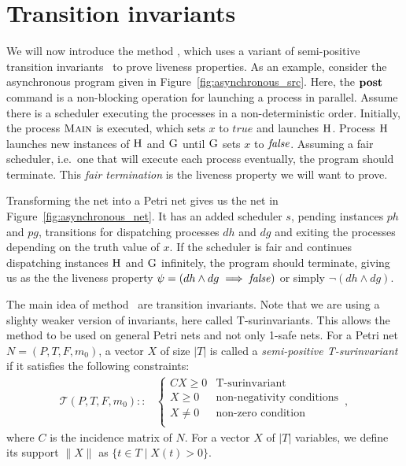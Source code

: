 \section{Transition invariants}
\label{sec:transition_invariants}

We will now introduce the method \liveness, which uses
a variant of semi-positive transition invariants~\cite{EsparzaBruns96}
to prove liveness properties. As an example, consider the
asynchronous program given in Figure~\ref{fig:asynchronous_src}.
Here, the $\textbf{post}$ command is a non-blocking operation for
launching a process in parallel. Assume there is a scheduler
executing the processes in a non-deterministic order.
Initially, the process $\textsc{Main}$ is executed, which
sets $x$ to $true$ and launches $\textsc{H}$.
Process $\textsc{H}$ launches new instances of $\textsc{H}$
and $\textsc{G}$ until $\textsc{G}$ sets $x$ to $\operatorname{\mathit{false}}$.
Assuming a fair scheduler, i.e.\ one that will execute each process
eventually, the program should terminate. This
\emph{fair termination} is the liveness
property we will want to prove.



Transforming the net into a Petri net gives us the net in
Figure~\ref{fig:asynchronous_net}. It has an added scheduler
$s$, pending instances $ph$ and $pg$, transitions for
dispatching processes $dh$ and $dg$ and exiting the processes
depending on the truth value of $x$.
If the scheduler is fair and continues dispatching instances
$\textsc{H}$ and $\textsc{G}$ 
infinitely, the program should terminate, giving us as the
the liveness property $\psi = (dh \land dg \implies \operatorname{\mathit{false}})$
or simply $\neg (dh \land dg)$.



The main idea of method \liveness\ are transition invariants.
Note that we are using a slighty weaker version of invariants,
here called T-surinvariants. This allows the method to be
used on general Petri nets and not only 1-safe nets.
For a Petri net $N = (P, T, F, m_0)$,
a vector $X$ of size $|T|$ is
called a \emph{semi-positive T-surinvariant} if it satisfies the following
constraints:
\begin{align*}
  \mathcal{T}(P, T, F, m_0) ::&
  \begin{cases}
    C X \ge 0 & \text{T-surinvariant} \\
      X \ge 0 & \text{non-negativity conditions} \\
      X \ne 0 & \text{non-zero condition} \\
  \end{cases}\,,
\end{align*}
where $C$ is the incidence matrix of $N$.
For a vector $X$ of $|T|$ variables, we define
its support $\|X\|$ as $\{ t ∈ T \mid X(t) > 0 \}$.

